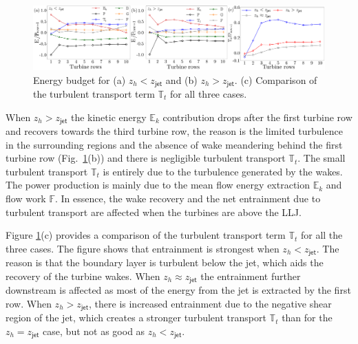 \documentclass[%
 aip,
 amsmath,amssymb,
preprint,%
author-numerical,%
]{revtex4-1}
\begin{document}
\begin{figure}
 \centering
 \includegraphics[width=\linewidth]{energy_budget}
 \vspace{-0.75cm}
 \caption{Energy budget for (a) $z_h < z_\mathsf{jet}$ and (b) $z_h > z_\mathsf{jet}$. (c) Comparison of the turbulent transport term $\mathbb{T}_t$ for all three cases.}
 \label{energybudget}
\end{figure}

When $z_h > z_\mathsf{jet}$ the kinetic energy $\mathbb{E}_k$ contribution drops after the first turbine row and recovers towards the third turbine row, the reason is the limited turbulence in the surrounding regions and the absence of wake meandering behind the first turbine row (Fig.\ \ref{energybudget}(b)) and there is negligible turbulent transport $\mathbb{T}_t$. The small turbulent transport $\mathbb{T}_t$ is entirely due to the turbulence generated by the wakes. The power production is mainly due to the mean flow energy extraction $\mathbb{E}_k$ and flow work $\mathbb{F}$. In essence, the wake recovery and the net entrainment due to turbulent transport are affected when the turbines are above the LLJ.

Figure \ref{energybudget}(c) provides a comparison of the turbulent transport term $\mathbb{T}_t$ for all the three cases. The figure shows that entrainment is strongest when $z_h < z_\mathsf{jet}$. The reason is that the boundary layer is turbulent below the jet, which aids the recovery of the turbine wakes. When $z_h \approx z_\mathsf{jet}$ the entrainment further downstream is affected as most of the energy from the jet is extracted by the first row. When $z_h > z_\mathsf{jet}$, there is increased entrainment due to the negative shear region of the jet, which creates a stronger turbulent transport $\mathbb{T}_t$ than for the $z_h=z_\mathsf{jet}$ case, but not as good as $z_h < z_\mathsf{jet}$.
\end{document}
